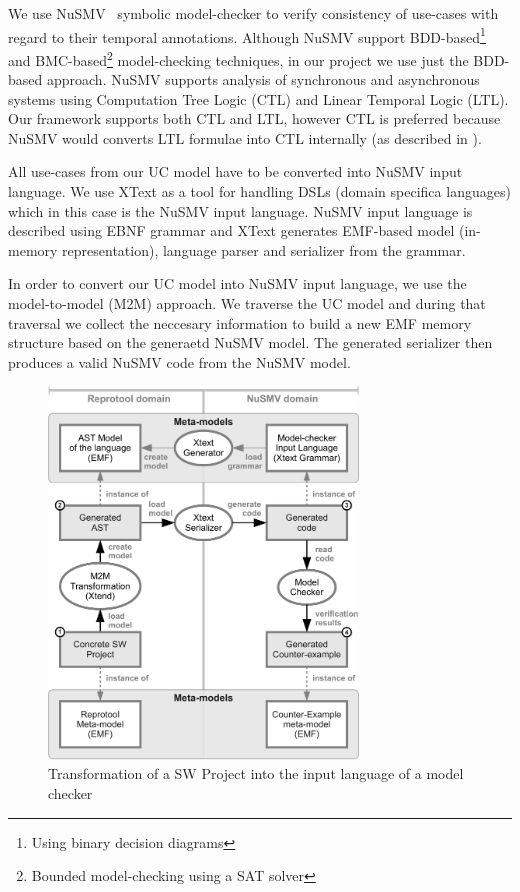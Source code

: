 We use NuSMV~\cite{NuSMV-CAV02,NuSMV-frocos02} symbolic model-checker to verify consistency of use-cases with regard to their temporal annotations.
Although NuSMV support BDD-based\footnote{Using binary decision diagrams} and BMC-based\footnote{Bounded model-checking using a SAT solver} model-checking techniques, in our project we use just the BDD-based approach.
NuSMV supports analysis of synchronous and asynchronous systems using Computation Tree Logic (CTL) and Linear Temporal Logic (LTL).
Our framework supports both CTL and LTL, however CTL is preferred because NuSMV would converts LTL formulae into CTL internally (as described in \cite{NuSMV-ltl-fmsd97}).

All use-cases from our UC model have to be converted into NuSMV input language.
We use XText as a tool for handling DSLs (domain specifica languages) which in this case is the NuSMV input language.
NuSMV input language is described using EBNF grammar and XText generates EMF-based model (in-memory representation), language parser and serializer from the grammar.

In order to convert our UC model into NuSMV input language, we use the model-to-model (M2M) approach.
We traverse the UC model and during that traversal we collect the neccesary information to build a new EMF memory structure based on the generaetd NuSMV model.
The generated serializer then produces a valid NuSMV code from the NuSMV model.

\begin{figure}[ht]
  \centering
  \includegraphics[height=280pt]{images/XtextWorkflow}
  \caption{Transformation of a SW Project into the input language of a model checker}
  \label{fig:XtextWorkflow}
\end{figure}
\pagebreak

